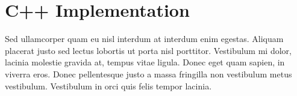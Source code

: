 
\section{C++ Implementation}

Sed ullamcorper quam eu nisl interdum at interdum enim egestas. Aliquam placerat justo sed lectus lobortis ut porta nisl porttitor. Vestibulum mi dolor, lacinia molestie gravida at, tempus vitae ligula. Donec eget quam sapien, in viverra eros. Donec pellentesque justo a massa fringilla non vestibulum metus vestibulum. Vestibulum in orci quis felis tempor lacinia. 

